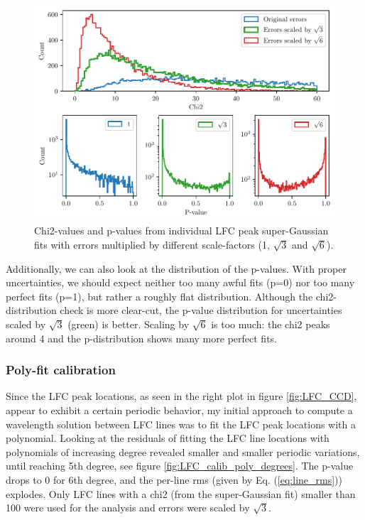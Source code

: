     \begin{figure}%
        \begin{wide}  
            \includegraphics[width=\textwidth]{figures/calib/calib_errors2.pdf}
            \caption{Chi2-values and p-values from individual LFC peak super-Gaussian fits with errors multiplied by different scale-factors (1, $\sqrt{3}$ and $\sqrt{6}$).}
        \label{fig:calib_errors}
        \end{wide}
    \end{figure}

    Additionally, we can also look at the distribution of the p-values. With proper uncertainties, we should expect neither too many awful fits (p=0) nor too many perfect fits (p=1), but rather a roughly flat distribution. Although the chi2-distribution check is more clear-cut, the p-value distribution for uncertainties scaled by $\sqrt{3}$ (green) is better. Scaling by $\sqrt{6}$ is too much: the chi2 peaks around 4 and the p-distribution shows many more perfect fits.

    \subsubsection{Poly-fit calibration}
    Since the LFC peak locations, as seen in the right plot in figure \ref{fig:LFC_CCD}, appear to exhibit a certain periodic behavior, my initial approach to compute a wavelength solution between LFC lines was to fit the LFC peak locations with a polynomial. Looking at the residuals of fitting the LFC line locations with polynomials of increasing degree revealed smaller and smaller periodic variations, until reaching 5th degree, see figure \ref{fig:LFC_calib_poly_degrees}. The p-value drops to 0 for 6th degree, and the per-line rms (given by Eq. (\ref{eq:line_rms})) explodes. Only LFC lines with a chi2 (from the super-Gaussian fit) smaller than 100 were used for the analysis and errors were scaled by $\sqrt{3}$.

